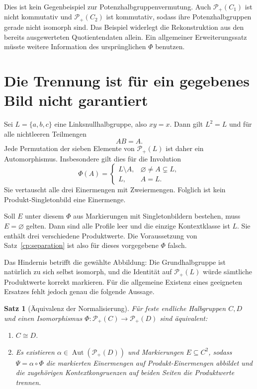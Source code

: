 \documentclass[a4paper,11pt]{article}
\newcommand{\Pp}[1]{\mathcal P_+(#1)}
\newtheorem{satz}{Satz}
\begin{document}
Dies ist kein Gegenbeispiel zur Potenzhalbgruppenvermutung.
Auch \(\Pp{C_1}\) ist nicht kommutativ und \(\Pp{C_2}\) ist
kommutativ, sodass ihre Potenzhalbgruppen gerade nicht isomorph
sind. Das Beispiel widerlegt die Rekonstruktion aus den bereits
ausgewerteten Quotientendaten allein. Ein allgemeiner
Erweiterungssatz müsste weitere Information des ursprünglichen
\(\Phi\) benutzen.

\section{Die Trennung ist für ein gegebenes Bild nicht garantiert}

Sei \(L=\{a,b,c\}\) eine Linksnullhalbgruppe, also \(xy=x\).
Dann gilt \(L^2=L\) und für alle nichtleeren Teilmengen
\[
 AB=A.
\]
Jede Permutation der sieben Elemente von \(\Pp L\) ist daher
ein Automorphismus. Insbesondere gilt dies für die Involution
\[
 \Phi(A)=
 \begin{cases}
 L\setminus A,&\varnothing\ne A\subsetneq L,\\
 L,&A=L.
 \end{cases}
\]
Sie vertauscht alle drei Einermengen mit Zweiermengen. Folglich
ist kein Produkt-Singletonbild eine Einermenge.

Soll \(E\) unter diesem \(\Phi\) aus Markierungen mit
Singletonbildern bestehen, muss \(E=\varnothing\) gelten. Dann sind
alle Profile leer und die einzige Kontextklasse ist \(L\).
Sie enthält drei verschiedene Produktwerte. Die Voraussetzung
von Satz~\ref{cp:separation} ist also für dieses vorgegebene
\(\Phi\) falsch.

Das Hindernis betrifft die gewählte Abbildung: Die Grundhalbgruppe
ist natürlich zu sich selbst isomorph, und die Identität auf
\(\Pp L\) würde sämtliche Produktwerte korrekt markieren.
Für die allgemeine Existenz eines geeigneten Ersatzes fehlt
jedoch genau die folgende Aussage.

\begin{satz}[Äquivalenz der Normalisierung]\label{cp:normalization}
Für feste endliche Halbgruppen \(C,D\) und einen Isomorphismus
\(\Phi:\Pp C\to\Pp D\) sind äquivalent:
\begin{enumerate}
 \item \(C\cong D\).
 \item Es existieren \(\alpha\in\operatorname{Aut}(\Pp D)\)
 und Markierungen \(E\subseteq C^2\), sodass
 \(\Psi=\alpha\circ\Phi\) die markierten Einermengen auf
 Produkt-Einermengen abbildet und die zugehörigen Kontextkongruenzen
 auf beiden Seiten die Produktwerte trennen.
\end{enumerate}
\end{satz}
\end{document}
